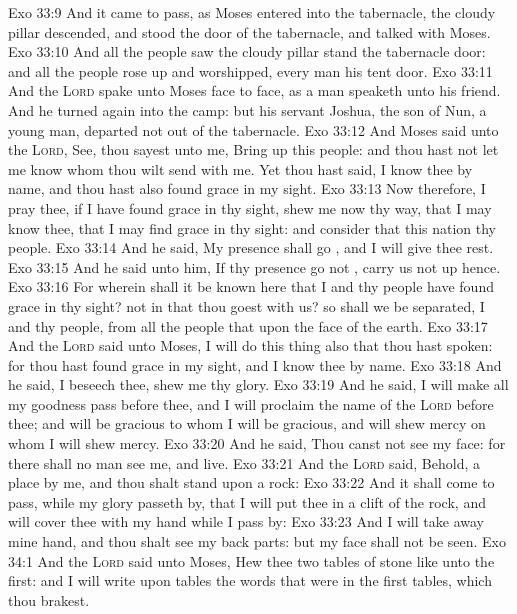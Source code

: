 \vs Exo 33:9 And it came to pass, as Moses entered into the tabernacle, the cloudy pillar descended, and stood  the door of the tabernacle, and  talked with Moses.
\vs Exo 33:10 And all the people saw the cloudy pillar stand  the tabernacle door: and all the people rose up and worshipped, every man  his tent door.
\vs Exo 33:11 And the \textsc{Lord} spake unto Moses face to face, as a man speaketh unto his friend. And he turned again into the camp: but his servant Joshua, the son of Nun, a young man, departed not out of the tabernacle.
\vs Exo 33:12 And Moses said unto the \textsc{Lord}, See, thou sayest unto me, Bring up this people: and thou hast not let me know whom thou wilt send with me. Yet thou hast said, I know thee by name, and thou hast also found grace in my sight.
\vs Exo 33:13 Now therefore, I pray thee, if I have found grace in thy sight, shew me now thy way, that I may know thee, that I may find grace in thy sight: and consider that this nation  thy people.
\vs Exo 33:14 And he said, My presence shall go , and I will give thee rest.
\vs Exo 33:15 And he said unto him, If thy presence go not , carry us not up hence.
\vs Exo 33:16 For wherein shall it be known here that I and thy people have found grace in thy sight?  not in that thou goest with us? so shall we be separated, I and thy people, from all the people that  upon the face of the earth.
\vs Exo 33:17 And the \textsc{Lord} said unto Moses, I will do this thing also that thou hast spoken: for thou hast found grace in my sight, and I know thee by name.
\vs Exo 33:18 And he said, I beseech thee, shew me thy glory.
\vs Exo 33:19 And he said, I will make all my goodness pass before thee, and I will proclaim the name of the \textsc{Lord} before thee; and will be gracious to whom I will be gracious, and will shew mercy on whom I will shew mercy.
\vs Exo 33:20 And he said, Thou canst not see my face: for there shall no man see me, and live.
\vs Exo 33:21 And the \textsc{Lord} said, Behold,  a place by me, and thou shalt stand upon a rock:
\vs Exo 33:22 And it shall come to pass, while my glory passeth by, that I will put thee in a clift of the rock, and will cover thee with my hand while I pass by:
\vs Exo 33:23 And I will take away mine hand, and thou shalt see my back parts: but my face shall not be seen.
\vs Exo 34:1 And the \textsc{Lord} said unto Moses, Hew thee two tables of stone like unto the first: and I will write upon  tables the words that were in the first tables, which thou brakest.
